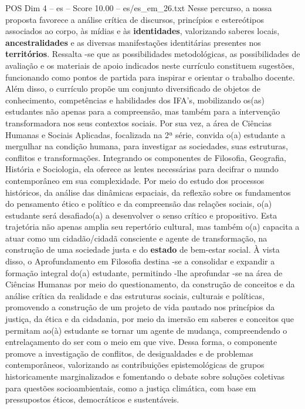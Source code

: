 \begin{textsample}{POS Dim 4 – es – Score 10.00 – es/es\_em\_26.txt}
Nesse percurso, a nossa proposta favorece a análise crítica de discursos, princípios e estereótipos associados ao corpo, às mídias e às \textbf{identidades}, valorizando saberes locais, \textbf{ancestralidades} e as diversas manifestações identitárias presentes nos \textbf{territórios}.
Ressalta -se que as possibilidades metodológicas, as possibilidades de avaliação e os materiais de apoio indicados neste currículo constituem sugestões, funcionando como pontos de partida para inspirar e orientar o trabalho docente.
Além disso, o currículo propõe um conjunto diversificado de objetos de conhecimento, competências e habilidades dos IFA’s, mobilizando os(as) estudantes não apenas para a compreensão, mas também para a intervenção transformadora nos seus contextos sociais.
Por sua vez, a área de Ciências Humanas e Sociais Aplicadas, focalizada na 2ª série, convida o(a) estudante a mergulhar na condição humana, para investigar as sociedades, suas estruturas, conflitos e transformações.
Integrando os componentes de Filosofia, Geografia, História e Sociologia, ela oferece as lentes necessárias para decifrar o mundo contemporâneo em sua complexidade.
Por meio do estudo dos processos históricos, da análise das dinâmicas espaciais, da reflexão sobre os fundamentos do pensamento ético e político e da compreensão das relações sociais, o(a) estudante será desafiado(a) a desenvolver o senso crítico e propositivo.
Esta trajetória não apenas amplia seu repertório cultural, mas também o(a) capacita a atuar como um cidadão/cidadã consciente e agente de transformação, na construção de uma sociedade justa e do \textbf{estado} de bem-estar social.
À vista disso, o Aprofundamento em Filosofia destina -se a consolidar e expandir a formação integral do(a) estudante, permitindo -lhe aprofundar -se na área de Ciências Humanas por meio do questionamento, da construção de conceitos e da análise crítica da realidade e das estruturas sociais, culturais e políticas, promovendo a construção de um projeto de vida pautado nos princípios da justiça, da ética e da cidadania, por meio da imersão em saberes e conceitos que permitam ao(à) estudante se tornar um agente de mudança, compreendendo o entrelaçamento do ser com o meio em que vive.
Dessa forma, o componente promove a investigação de conflitos, de desigualdades e de problemas contemporâneos, valorizando as contribuições epistemológicas de grupos historicamente marginalizados e fomentando o debate sobre soluções coletivas para questões socioambientais, como a justiça climática, com base em pressupostos éticos, democráticos e sustentáveis.

\end{textsample}
